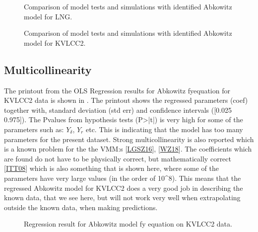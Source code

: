\documentclass[review]{elsarticle}
\begin{document}
\begin{figure}[htbp]
\centering
\capstart

\noindent{}
\caption{Comparison of model tests and simulations with identified Abkowitz model for LNG.}\label{\detokenize{05.01_model_tests:lng}}\end{figure}

\begin{figure}[htbp]
\centering
\capstart

\noindent{}
\caption{Comparison of model tests and simulations with identified Abkowitz model for KVLCC2.}\label{\detokenize{05.01_model_tests:kvlcc2-hsva}}\end{figure}


\subsection{Multicollinearity}
\label{\detokenize{05.01_model_tests:multicollinearity}}
\sphinxAtStartPar
The printout from the OLS Regression results for Abkowitz fy\sphinxhyphen{}equation for KVLCC2 data is shown in {\hyperref[\detokenize{05.01_model_tests:regression-abkowitz-summary}]{}}. The printout shows the regressed parameters (coef) together with, standard deviation (std err) and confidence intervals ({[}0.025 	0.975{]}). The P\sphinxhyphen{}values from hypothesis tests (P>|t|) is very high for some of the parameters such as: \(Y_{\delta}\), \(Y_r\) etc. This is indicating that the model has too many parameters for the present dataset. Strong multicollinearity is also reported which is a known problem for the the VMM:s {[}\hyperlink{cite.bibligraphy:id150}{LGSZ16}{]}, {[}\hyperlink{cite.bibligraphy:id180}{WZ18}{]}. The coefficients which are found do not
have to be physically correct, but mathematically correct {[}\hyperlink{cite.bibligraphy:id204}{ITT08}{]} which is also something that is shown here, where some of the parameters have very large values (in the order of 10\textasciicircum{}8). This means that the regressed Abkowitz model for KVLCC2 does a very good job in describing the known data, that we see here, but will not work very well when extrapolating outside the known data, when making predictions.

\begin{figure}[htbp]
\centering
\capstart

\noindent{}
\caption{Regression result for Abkowitz model fy equation on KVLCC2 data.}\label{\detokenize{05.01_model_tests:regression-abkowitz-summary}}\end{figure}
\end{document}
